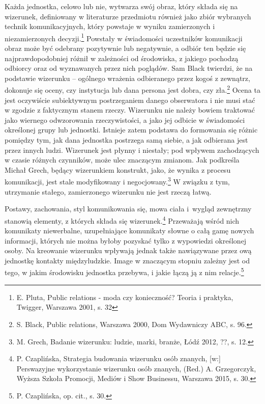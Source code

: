 \documentclass[12pt, a4paper, titlepage]{report}
\begin{document}
Każda jednostka, celowo lub nie, wytwarza swój obraz, który składa się na wizerunek, definiowany w literaturze przedmiotu również jako zbiór wybranych technik komunikacyjnych, który powstaje w wyniku zamierzonych i niezamierzonych decyzji.\footnote{E. Pluta, Public relations - moda czy konieczność? Teoria i praktyka, Twigger, Warszawa 2001, s. 32} Powstały w świadomości uczestników komunikacji obraz może być odebrany pozytywnie lub negatywnie, a odbiór ten będzie się najprawdopodobniej różnił w zależności od środowiska, z jakiego pochodzą odbiorcy oraz od wyznawanych przez nich poglądów. Sam Black twierdzi, że na podstawie wizerunku -- ogólnego wrażenia odbieranego przez kogoś z zewnątrz, dokonuje się oceny, czy instytucja lub dana persona jest dobra, czy zła.\footnote{S. Black, Public relations, Warszawa 2000, Dom Wydawniczy ABC, s. 96.} Ocena ta jest oczywiście subiektywnym postrzeganiem danego obserwatora i nie musi stać w zgodzie z faktycznym stanem rzeczy. Wizerunku nie należy bowiem traktować jako wiernego odwzorowania rzeczywistości, a jako jej odbicie w świadomości określonej grupy lub jednostki. Istnieje zatem podstawa do formowania się różnic pomiędzy tym, jak dana jednostka postrzega samą siebie, a jak odbierana jest przez innych ludzi. Wizerunek jest płynny i niestały; pod wpływem zachodzących w czasie różnych czynników, może ulec znaczącym zmianom. Jak podkreśla Michał Grech, będący wizerunkiem konstrukt, jako, że wynika z procesu komunikacji, jest stale modyfikowany i negocjowany.\footnote{M. Grech, Badanie wizerunku: ludzie, marki, branże, Łódź 2012, ??, s. 12.} W związku z tym, utrzymanie stałego, zamierzonego wizerunku nie jest rzeczą łatwą. 

Postawy, zachowania, styl komunikowania się, mowa ciała i~wygląd zewnętrzny stanowią elementy, z których składa się wizerunek.\footnote{P. Czaplińska, Strategia budowania wizerunku osób znanych, [w:] Perswazyjne wykorzystanie wizerunku osób znanych, (Red.) A. Grzegorczyk, Wyższa Szkoła Promocji, Mediów i Show Businessu, Warszawa 2015, s. 30.} Przeważają wśród nich komunikaty niewerbalne, uzupełniające komunikaty słowne o całą gamę nowych informacji, których nie można byłoby pozyskać tylko z wypowiedzi określonej osoby. Na kreowanie wizerunku wpływają jednak także nawiązywane przez ową jednostkę kontakty międzyludzkie. Image w znaczącym stopniu zależny jest od tego, w jakim środowisku jednostka przebywa, i jakie łączą ją z nim relacje.\footnote{P. Czaplińska, op. cit., s. 30.}

\end{document}
